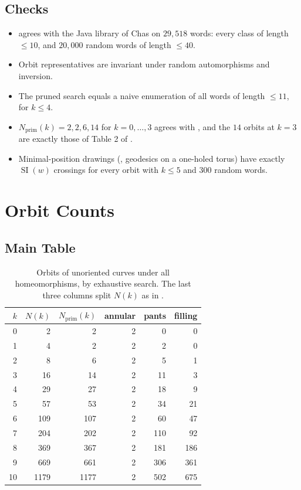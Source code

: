 \documentclass[10pt]{article}
\begin{document}
\subsection{Checks}

\begin{itemize}
	\item {} agrees with the Java library of Chas on $29{,}518$ words: every class of length $\leq 10$, and $20{,}000$ random words of length $\leq 40$.
	\item Orbit representatives are invariant under random automorphisms and inversion.
	\item The pruned search equals a naive enumeration of all words of length $\leq 11$, for $k \leq 4$.
	\item $N_{\text{prim}}(k) = 2, 2, 6, 14$ for $k = 0,\ldots,3$ agrees with \citet{crisp98,chas16}, and the $14$ orbits at $k=3$ are exactly those of Table 2 of \citet{chas16}.
	\item Minimal-position drawings (, geodesics on a one-holed torus) have exactly $\operatorname{SI}(w)$ crossings for every orbit with $k \leq 5$ and $300$ random words.
\end{itemize}

\section{Orbit Counts}

\subsection{Main Table}

\begin{table}[H]
	\centering
	\begin{tabular}{r|rr|rrr}
		\toprule
		$k$ & $N(k)$ & $N_{\text{prim}}(k)$ & annular & pants & filling \\
		\midrule
		0 & 2 & 2 & 2 & 0 & 0 \\
		1 & 4 & 2 & 2 & 2 & 0 \\
		2 & 8 & 6 & 2 & 5 & 1 \\
		3 & 16 & 14 & 2 & 11 & 3 \\
		4 & 29 & 27 & 2 & 18 & 9 \\
		5 & 57 & 53 & 2 & 34 & 21 \\
		6 & 109 & 107 & 2 & 60 & 47 \\
		7 & 204 & 202 & 2 & 110 & 92 \\
		8 & 369 & 367 & 2 & 181 & 186 \\
		9 & 669 & 661 & 2 & 306 & 361 \\
		10 & 1179 & 1177 & 2 & 502 & 675 \\
		\bottomrule
	\end{tabular}
	\caption{Orbits of unoriented curves under all homeomorphisms, by exhaustive search. The last three columns split $N(k)$ as in .}
	\label{tab:main}
\end{table}
\end{document}
